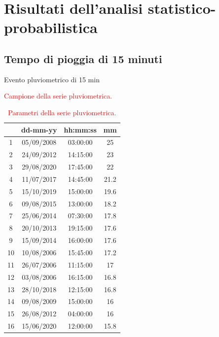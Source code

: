 \section{Risultati dell'analisi statistico-probabilistica}
\subsection{Tempo di pioggia di 15 minuti}

\begin{table}[H]
    \caption*{Evento pluviometrico di 15 min}
    \begin{minipage}{.5\linewidth}
      \caption{\textcolor{red}{Campione della serie pluviometrica.}}
      \centering
        \begin{tabular}{cccc}
            \toprule    
            & dd-mm-yy   & hh:mm:ss & mm \\
            \midrule
         1  & 05/09/2008 & 03:00:00 & 25   \\
         2  & 24/09/2012 & 14:15:00 & 23   \\
         3  & 29/08/2020 & 17:45:00 & 22   \\
         4  & 11/07/2017 & 14:45:00 & 21.2 \\
         5  & 15/10/2019 & 15:00:00 & 19.6 \\
         6  & 09/08/2015 & 13:00:00 & 18.2 \\
         7  & 25/06/2014 & 07:30:00 & 17.8 \\
         8  & 20/10/2013 & 19:15:00 & 17.6 \\
         9  & 15/09/2014 & 16:00:00 & 17.6 \\
         10 & 10/08/2006 & 15:45:00 & 17.2 \\
         11 & 26/07/2006 & 11:15:00 & 17   \\
         12 & 03/08/2006 & 16:15:00 & 16.8 \\
         13 & 28/10/2018 & 12:15:00 & 16.8 \\
         14 & 09/08/2009 & 15:00:00 & 16   \\
         15 & 26/08/2012 & 04:00:00 & 16   \\
         16 & 15/06/2020 & 12:00:00 & 15.8 \\
         \bottomrule
        \end{tabular}
    \end{minipage}%
    \begin{minipage}{.5\linewidth}
      \centering
        \caption{\textcolor{red}{Parametri della serie pluviometrica.}}

\end{minipage}
\end{table}
